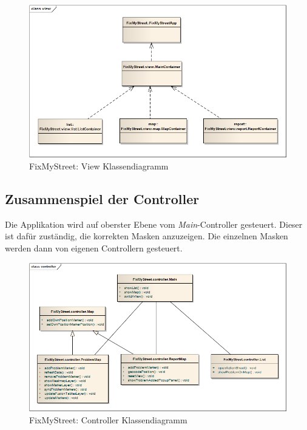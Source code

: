 \begin{figure}[H]
	\centering
	\includegraphics[width=\textwidth]{images/usecase2-fixmystreet/uml/fixmystreet-view-classmodel}
	\caption{FixMyStreet: View Klassendiagramm}
	\label{fixmystreet-view-classmodel}
\end{figure}


\subsection{Zusammenspiel der Controller}
Die Applikation wird auf oberster Ebene vom \emph{Main}-Controller gesteuert. Dieser ist dafür zuständig, die korrekten Masken anzuzeigen. Die einzelnen Masken werden dann von eigenen Controllern gesteuert.

\begin{figure}[H]
	\centering
	\includegraphics[width=\textwidth]{images/usecase2-fixmystreet/uml/fixmystreet-controller-classmodel}
	\caption{FixMyStreet: Controller Klassendiagramm}
	\label{fixmystreet-controller-classmodel}
\end{figure}

